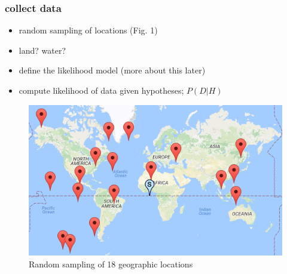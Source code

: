 \documentclass[10pt]{article}
\begin{document}
		\subsubsection{collect data}
			\begin{itemize}
				\item random sampling of locations (Fig. 1)
				\item land? water?
				\item define the likelihood model (more about this later)
				\item compute likelihood of data given hypotheses; $P(D|H)$
			\end{itemize}					
			\begin{figure}[H]
				\centering
				\includegraphics[scale=0.5]{randomMapPts.png}
				\caption{Random sampling of 18 geographic locations}
			\end{figure}
		\FloatBarrier
\end{document}
